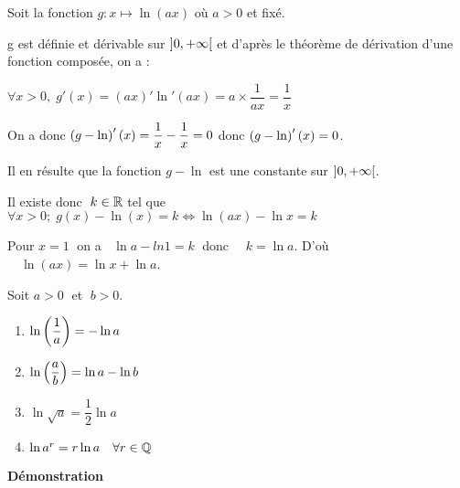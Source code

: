 Soit la fonction  $g : x \mapsto \ln(ax)$ où $ a > 0 $ et fixé.

g est définie et dérivable sur $]0 , +\infty[$ et d'après le théorème de dérivation d'une fonction composée,
on a :

$ \forall x > 0,\;  g'(x) = (ax)'\ln'(ax) = a \times \dfrac{1}{ax}=\dfrac{1}{x}$


On a donc $\left(g - \ln\right)' (x) = \dfrac{1}{x}-\dfrac{1}{x}= 0$ donc $ \left(g - \ln \right)'(x) = 0$.

Il en résulte que la fonction $g - \ln$  est une constante sur $]0 , +\infty[$.

Il existe donc  $\; k \in \mathbb{R}$ tel que $\forall x > 0 ;\; g (x)- \ln (x) = k \Leftrightarrow \ln(ax) - \ln x = k$

Pour  $x = 1\;$  on a $\;\; \ln a - ln 1 
= k\; $ donc  $\quad k = \ln a$. D’où $\quad\ln(ax) = \ln x + \ln a$.

\begin{corollary} 
Soit $ a > 0\;$  et  $\; b > 0$.
\begin{enumerate}
\item $  \ln \left(\dfrac{1}{a}\right)= - \ln a$
\item $\ln \left(\dfrac{a}{b} \right)= \ln a-  \ln b$
 \item $  \ln \sqrt{a} = \dfrac{1}{2} \ln a$
 \item $ \ln a^{r} = r\ln a \quad \forall r\in\mathbb{Q}$
\end{enumerate}

\end{corollary} 




\textbf{Démonstration}

